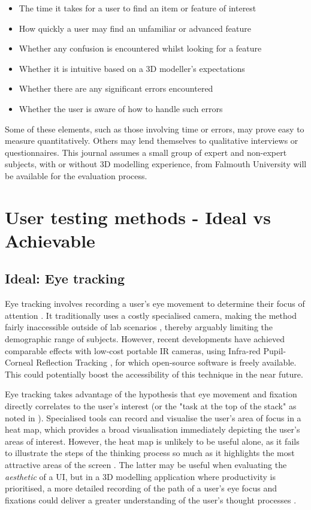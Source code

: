 \documentclass{scrartcl}
\begin{document}
\begin{itemize}
	\item The time it takes for a user to find an item or feature of interest
	\item How quickly a user may find an unfamiliar or advanced feature
	\item Whether any confusion is encountered whilst looking for a feature
	\item Whether it is intuitive based on a 3D modeller's expectations
	\item Whether there are any significant errors encountered
	\item Whether the user is aware of how to handle such errors
\end{itemize}

Some of these elements, such as those involving time or errors, may prove easy to measure quantitatively. Others may lend themselves to qualitative interviews or questionnaires. This journal assumes a small group of expert and non-expert subjects, with or without 3D modelling experience, from Falmouth University will be available for the evaluation process.

\section{User testing methods - Ideal vs Achievable}
\subsection{Ideal: Eye tracking}
Eye tracking involves recording a user's eye movement to determine their focus of attention \cite{poole_eye_2006} \cite{tsai_visual_2012}. It traditionally uses a costly specialised camera, making the method fairly inaccessible outside of lab scenarios \cite{ho_low_2014}, thereby arguably limiting the demographic range of subjects. However, recent developments have achieved comparable effects with low-cost portable IR cameras, using Infra-red Pupil-Corneal Reflection Tracking \cite{majaranta_chapter_2014} \cite{lowcosttracker}, for which open-source software \cite{ho_low_2014} is freely available. This could potentially boost the accessibility of this technique in the near future.

Eye tracking takes advantage of the hypothesis that eye movement and fixation directly correlates to the user's interest (or the "task at the top of the stack" as noted in \cite{just_eye_1976}). Specialised tools can record and visualise the user's area of focus in a heat map, which provides a broad visualisation immediately depicting the user's areas of interest. However, the heat map is unlikely to be useful alone, as it fails to illustrate the steps of the thinking process so much as it highlights the most attractive areas of the screen \cite{gazepatterns}. The latter may be useful when evaluating the \textit{aesthetic} of a UI, but in a 3D modelling application where productivity is prioritised, a more detailed recording of the path of a user's eye focus and fixations could deliver a greater understanding of the user's thought processes \cite{just_eye_1976} \cite{tsai_visual_2012}.
\end{document}
